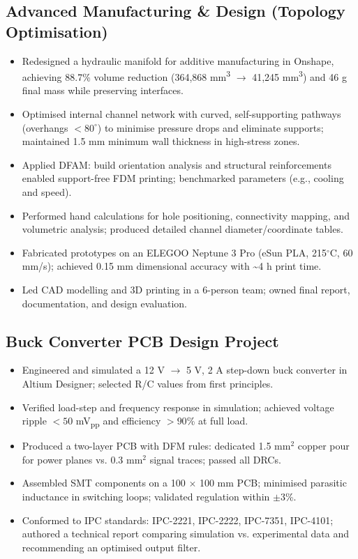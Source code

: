 \documentclass[11pt,a4paper]{article}
\begin{document}
\subsection{Advanced Manufacturing \& Design (Topology Optimisation)}
\begin{itemize}
    \item Redesigned a hydraulic manifold for additive manufacturing in Onshape, achieving 88.7\% volume reduction (364,868 mm\textsuperscript{3} $\rightarrow$ 41,245 mm\textsuperscript{3}) and 46 g final mass while preserving interfaces.
    \item Optimised internal channel network with curved, self-supporting pathways (overhangs $< 80^\circ$) to minimise pressure drops and eliminate supports; maintained 1.5 mm minimum wall thickness in high-stress zones.
    \item Applied DFAM: build orientation analysis and structural reinforcements enabled support-free FDM printing; benchmarked parameters (e.g., cooling and speed).
    \item Performed hand calculations for hole positioning, connectivity mapping, and volumetric analysis; produced detailed channel diameter/coordinate tables.
    \item Fabricated prototypes on an ELEGOO Neptune 3 Pro (eSun PLA, 215$^\circ$C, 60 mm/s); achieved 0.15 mm dimensional accuracy with \textasciitilde 4 h print time.
    \item Led CAD modelling and 3D printing in a 6-person team; owned final report, documentation, and design evaluation.
\end{itemize}

\subsection{Buck Converter PCB Design Project}
\begin{itemize}
    \item Engineered and simulated a 12 V $\rightarrow$ 5 V, 2 A step-down buck converter in Altium Designer; selected R/C values from first principles.
    \item Verified load-step and frequency response in simulation; achieved voltage ripple $< 50$ mV\textsubscript{pp} and efficiency $> 90$\% at full load.
    \item Produced a two-layer PCB with DFM rules: dedicated 1.5 mm$^2$ copper pour for power planes vs. 0.3 mm$^2$ signal traces; passed all DRCs.
    \item Assembled SMT components on a 100 $\times$ 100 mm PCB; minimised parasitic inductance in switching loops; validated regulation within $\pm 3$\%.
    \item Conformed to IPC standards: IPC-2221, IPC-2222, IPC-7351, IPC-4101; authored a technical report comparing simulation vs. experimental data and recommending an optimised output filter.
\end{itemize}
\end{document}
